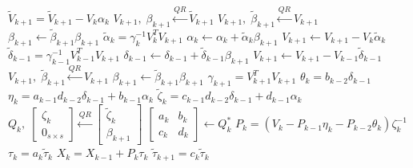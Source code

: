             \begin{algorithm}[H]
            \begin{algorithmic}[1] 
            \State $\tilde{V}_{k+1} = \tilde{V}_{k+1} - V_k \alpha_k$
            \State $ V_{k+1},\; \beta_{k+1} \xleftarrow{QR} \tilde{V}_{k+1} $
            {\color{red}\State $ V_{k+1},\; \tilde{\beta}_{k+1} \xleftarrow{QR} V_{k+1}$
            \State $ \beta_{k+1} \gets \tilde{\beta}_{k+1} \beta_{k+1} $
            \State $\tilde{\alpha}_k = \gamma_k^{-1} V_k^T V_{k+1}$
            \State $ \alpha_k \gets \alpha_k + \tilde{\alpha}_k \beta_{k+1} $
            \State $ V_{k+1} \gets V_{k+1} - V_k \tilde{\alpha}_k $
            \State $ \tilde{\delta}_{k-1} = \gamma_{k-1}^{-1} V_{k-1}^T V_{k+1} $
            \State $ \delta_{k-1} \gets \delta_{k-1} + \tilde{\delta}_{k-1} \beta_{k+1} $ 
            \State $ V_{k+1} \gets V_{k+1} - V_{k-1} \tilde{\delta}_{k-1} $
            \State $ V_{k+1}, \; \tilde{\beta}_{k+1} \xleftarrow{QR} V_{k+1} $
            \State $ \beta_{k+1} \gets \tilde{\beta}_{k+1} \beta_{k+1} $}
            \State $\gamma_{k+1} = V_{k+1}^T V_{k+1}$
            \State $\theta_k = b_{k-2} \delta_{k-1}$
            \State $\eta_k = a_{k-1}d_{k-2}\delta_{k-1} + b_{k-1}\alpha_k$
            \State $\tilde{\zeta}_k = c_{k-1} d_{k-2} \delta_{k-1} + d_{k-1} \alpha_k$
            \State $ Q_k ,\; 
                    \begin{bmatrix}
                        \zeta_k \\
                        0_{s \times s}
                    \end{bmatrix} \xleftarrow{QR} \begin{bmatrix}
                                        \tilde{\zeta}_k \\
                                        \beta_{k+1}
                                     \end{bmatrix}$
            \State $\begin{bmatrix}
                        a_k & b_k \\
                        c_k & d_k
                    \end{bmatrix} \gets Q_k^*$
            \State $P_k = (V_k - P_{k-1}\eta_k - P_{k-2} \theta_k)\zeta_k^{-1}$
            \State $\tau_k = a_k \tilde{\tau}_k$
            \State $X_k = X_{k-1} + P_{k} \tau_{k}$
            \State $\tilde{\tau}_{k+1} = c_k \tilde{\tau}_k$
        \EndFor
    \end{algorithmic}
\end{algorithm}

